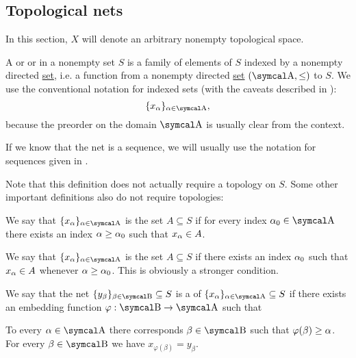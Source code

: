 \subsection{Topological nets}\label{subsec:topological_nets}

In this section, \( X \) will denote an arbitrary nonempty topological space.

\begin{definition}\label{def:topological_net}
  A  or  or  in a nonempty set \( S \) is a family of elements of \( S \) indexed by a nonempty directed \hyperref[def:indexed_family]{set}, i.e. a function from a nonempty directed \hyperref[def:directed_set]{set} \( (\CA, \leq) \) to \( S \). We use the conventional notation for indexed sets (with the caveats described in ):
  \begin{equation*}
    \{ x_\al \}_{\al \in \CA},
  \end{equation*}
  because the preorder on the domain \( \CA \) is usually clear from the context.

  If we know that the net is a sequence, we will usually use the notation for sequences given in .

  Note that this definition does not actually require a topology on \( S \). Some other important definitions also do not require topologies:
  \begin{defenum}
     We say that \( \{ x_\al \}_{\al \in \CA} \) is  the set \( A \subseteq S \) if for every index \( \al_0 \in \CA \) there exists an index \( \alpha \geq \alpha_0 \) such that \( x_\alpha \in A \).

     We say that \( \{ x_\al \}_{\al \in \CA} \) is  the set \( A \subseteq S \) if there exists an index \( \alpha_0 \) such that \( x_\alpha \in A \) whenever \( \alpha \geq \alpha_0 \). This is obviously a stronger condition.

    \cite[50]{Engelking1989} We say that the net \( \{ y_\beta \}_{\beta \in \CB} \subseteq S \) is a  of \( \{ x_\al \}_{\al \in \CA} \subseteq S \) if there exists an embedding function \( \varphi: \CB \to \CA \) such that
    \begin{defenum}
       To every \( \al \in \CA \) there corresponds \( \beta \in \CB \) such that \( \varphi(\beta) \geq \alpha \).
       For every \( \beta \in \CB \) we have \( x_{\varphi(\beta)} = y_\beta \).
    \end{defenum}
  \end{defenum}
\end{definition}

